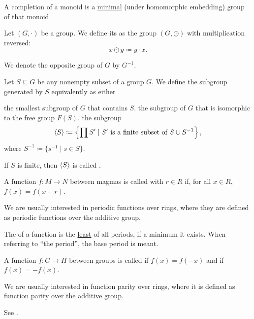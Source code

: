\begin{definition}\label{def:monoid_completion}
  A completion of a monoid is a \hyperref[def:preordered_set/maximal_minimal_element]{minimal} (under homomorphic embedding) group of that monoid.
\end{definition}

\begin{definition}\label{def:opposite_group}
  Let \( (G, \cdot) \) be a group. We define its  as the group \( (G, \odot) \) with multiplication reversed:
  \begin{equation*}
    x \odot y \coloneqq y \cdot x.
  \end{equation*}

  We denote the opposite group of \( G \) by \( G^{-1} \).
\end{definition}

\begin{definition}\label{def:generated_subgroup}
  Let \( S \subseteq G \) be any nonempty subset of a group \( G \). We define the subgroup generated by \( S \) equivalently as either
  \begin{defenum}
     the smallest subgroup of \( G \) that contains \( S \).
     the subgroup of \( G \) that is isomorphic to the free group \( F(S) \).
     the subgroup
    \begin{equation*}
      \left\langle S \right\rangle \coloneqq \left\{ \prod S' \mid S' \text{ is a finite subset of } S \cup S^{-1} \right\},
    \end{equation*}
    where \( S^{-1} \coloneqq \{ s^{-1} \mid s \in S \} \).
  \end{defenum}

  If \( S \) is finite, then \( \left\langle S \right\rangle \) is called .
\end{definition}

\begin{definition}\label{def:periodic_function}
  A function \( f: M \to N \) between magmas is called  with  \( r \in R \) if, for all \( x \in R \), \( f(x) = f(x + r) \).

  We are usually interested in periodic functions over rings, where they are defined as periodic functions over the additive group.

  The  of a function is the \hyperref[def:preordered_set/largest_smallest_element]{least} of all periods, if a minimum it exists. When referring to \enquote{the period}, the base period is meant.
\end{definition}

\begin{definition}\label{def:function_pairity}
  A function \( f: G \to H \) between groups is called  if \( f(x) = f(-x) \) and  if \( f(x) = -f(x) \).

  We are usually interested in function parity over rings, where it is defined as function parity over the additive group.

  See .
\end{definition}
